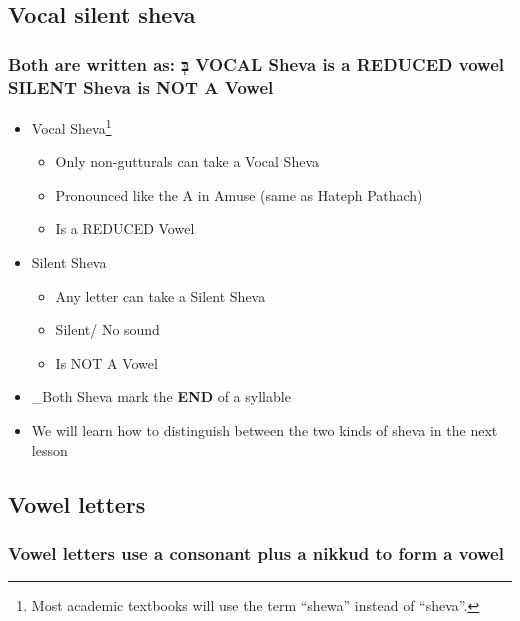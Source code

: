 \documentclass[
]{turabian-researchpaper}
\providecommand{\tightlist}{%
  \setlength{\itemsep}{0pt}\setlength{\parskip}{0pt}}
\begin{document}
\hypertarget{two_2}{%
\subsection{Vocal silent sheva}\label{two_2}}

\hypertarget{both-are-written-as-ux5d1ux5bcux5b0-vocal-sheva-is-a-reduced-vowel-silent-sheva-is-not-a-vowel}{%
\subsubsection{Both are written as: בְּ \textbar{} VOCAL Sheva is a REDUCED vowel \textbar{} SILENT Sheva is NOT A Vowel}\label{both-are-written-as-ux5d1ux5bcux5b0-vocal-sheva-is-a-reduced-vowel-silent-sheva-is-not-a-vowel}}

\begin{itemize}
\tightlist
\item
  Vocal Sheva\footnote{Most academic textbooks will use the term ``shewa'' instead of ``sheva''.}

  \begin{itemize}
  \tightlist
  \item
    Only non-gutturals can take a Vocal Sheva
  \item
    Pronounced like the A in Amuse (same as Hateph Pathach)
  \item
    Is a REDUCED Vowel
  \end{itemize}
\item
  Silent Sheva

  \begin{itemize}
  \tightlist
  \item
    Any letter can take a Silent Sheva
  \item
    Silent/ No sound
  \item
    Is NOT A Vowel
  \end{itemize}
\item
  \_Both Sheva mark the \textbf{END} of a syllable
\item
  We will learn how to distinguish between the two kinds of sheva in the next lesson
\end{itemize}

\hypertarget{two_3}{%
\subsection{Vowel letters}\label{two_3}}

\hypertarget{vowel-letters-use-a-consonant-plus-a-nikkud-to-form-a-vowel}{%
\subsubsection*{Vowel letters use a consonant plus a nikkud to form a vowel}\label{vowel-letters-use-a-consonant-plus-a-nikkud-to-form-a-vowel}}
\end{document}

